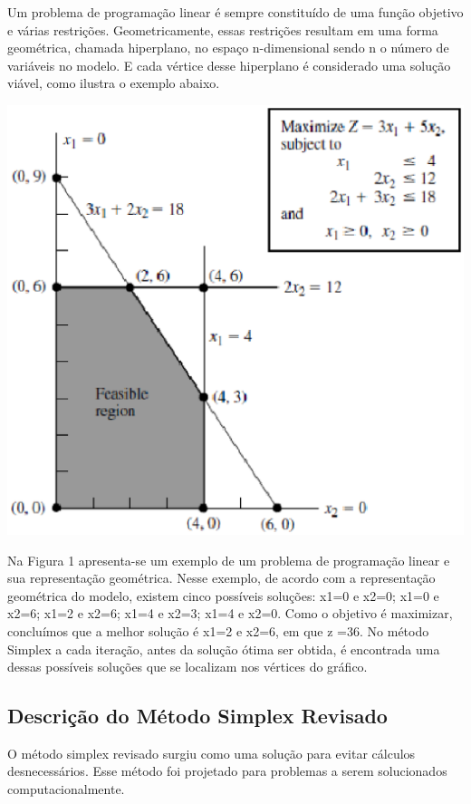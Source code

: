 Um problema de programação linear é sempre constituído de uma função objetivo e várias restrições. Geometricamente, essas restrições resultam em uma forma geométrica, chamada hiperplano, no espaço n-dimensional sendo n o número de variáveis no modelo. E cada vértice desse hiperplano é considerado uma solução viável, como ilustra o exemplo abaixo.
\begin{center}
	\includegraphics[scale=0.5]{graficos/Simplex_grafico_completo}
	\cite{Hillier}
\end{center}

Na Figura 1 apresenta-se um exemplo de um problema de programação linear e sua representação geométrica. Nesse exemplo, de acordo com a representação geométrica do modelo, existem cinco possíveis soluções: x1=0 e  x2=0; x1=0 e  x2=6; x1=2 e  x2=6; x1=4 e  x2=3; x1=4 e x2=0. Como o objetivo é maximizar, concluímos que a melhor solução é x1=2 e  x2=6, em que z =36. No método Simplex a cada iteração, antes da solução ótima ser obtida, é encontrada uma dessas possíveis soluções que se localizam nos vértices do gráfico.

\subsection{Descrição do Método Simplex Revisado}
O método simplex revisado surgiu como uma solução para evitar cálculos desnecessários. Esse método foi projetado para problemas a serem solucionados computacionalmente.

